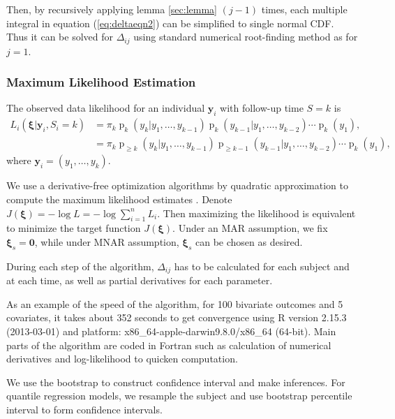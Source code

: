 \documentclass[12pt]{article}
\DeclareMathOperator{\pr}{p}
\begin{document}
\begin{itemize}
  Then, by recursively applying lemma \ref{sec:lemma} $(j-1)$ times,
  each multiple integral in equation (\ref{eq:deltaeqn2}) can be
  simplified to single normal CDF. Thus it can be solved for
  $\Delta_{ij}$ using standard numerical root-finding method as for $j
  = 1$.

\end{itemize}

\subsubsection{Maximum Likelihood Estimation}
\label{sec:mle}

The observed data likelihood for an individual $\bm y_i$ with
follow-up time $S = k$ is
\begin{align} \label{eq:ll} L_i(\bm \xi| \bm y_i, S_{i} = k) & =
  \pi_k\pr_k (y_k | y_1, \ldots, y_{k-1})
  \pr_k (y_{k-1}|y_1, \ldots, y_{k-2}) \cdots \pr_{k} (y_1), \\
  & = \pi_k \pr_{\geq k} (y_k | y_1, \ldots, y_{k-1}) \pr_{\geq k-1}
  (y_{k-1}|y_1, \ldots, y_{k-2}) \cdots \pr_{k} (y_1), \nonumber
\end{align}
where $\bm y_i = (y_1, \ldots, y_k)$.

We use a derivative-free optimization algorithms by quadratic
approximation to compute the maximum
likelihood estimates \citep{minqa}. Denote $J(\bm \xi) = - \log L =
- \log \sum_{i = 1}^n L_i$.  Then maximizing the likelihood is
equivalent to minimize the target function $J(\bm \xi)$. Under an MAR
assumption, we fix $\bm \xi_s = \bm 0$, while under MNAR assumption,
$\bm \xi_s $ can be chosen as desired.

During each step of the algorithm, $\Delta_{ij}$ has to be calculated
for each subject and at each time, as well as partial derivatives for
each parameter.

As an example of the speed of the algorithm, for 100 bivariate
outcomes and 5 covariates, it takes about 352 seconds
to get convergence using R version 2.15.3 (2013-03-01) \citep{R} and
platform: x86\_64-apple-darwin9.8.0/x86\_64 (64-bit). Main parts of
the algorithm are coded in Fortran such as calculation of numerical
derivatives and log-likelihood to quicken computation.

We use the bootstrap \citep{efron1979,efron1993,divison1997} to
construct confidence interval and make inferences.  For quantile
regression models, we resample the subject and use bootstrap
percentile interval to form confidence intervals.
\end{document}
